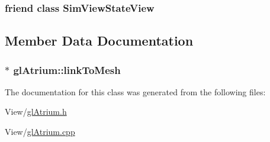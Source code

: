 \hypertarget{classgl_atrium_a3784e26d08f8db67d4187df43944ad76}{
\subsubsection[{Sim\+View\+State\+View}]{\setlength{\rightskip}{0pt plus 5cm}friend class {\bf Sim\+View\+State\+View}\hspace{0.3cm}{\ttfamily [friend]}}}\label{classgl_atrium_a3784e26d08f8db67d4187df43944ad76}


\subsection{Member Data Documentation}
\hypertarget{classgl_atrium_a8ded24946b8c91b4e1fb7f4f0545a6b0}{
\subsubsection[{link\+To\+Mesh}]{$\ast$ gl\+Atrium\+::link\+To\+Mesh}}\label{classgl_atrium_a8ded24946b8c91b4e1fb7f4f0545a6b0}


The documentation for this class was generated from the following files\+:\begin{DoxyCompactItemize}
\item 
View/\hyperlink{gl_atrium_8h}{gl\+Atrium.\+h}\item 
View/\hyperlink{gl_atrium_8cpp}{gl\+Atrium.\+cpp}\end{DoxyCompactItemize}
